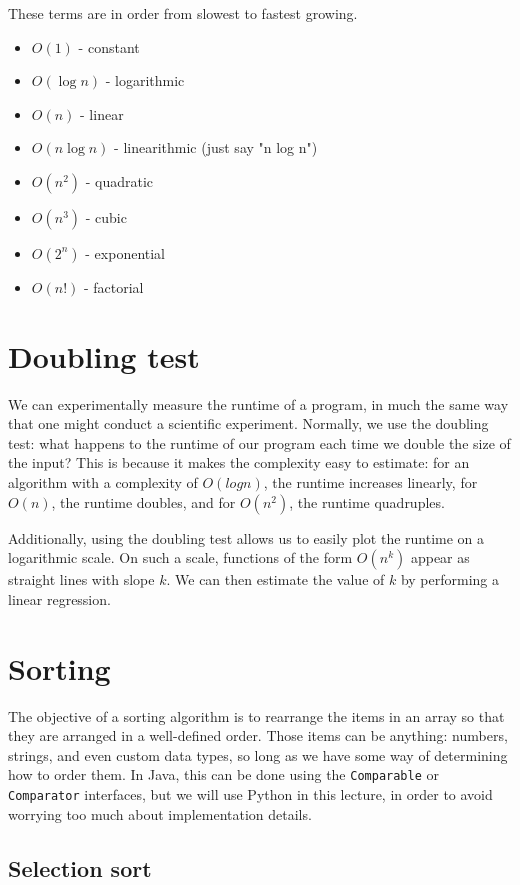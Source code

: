 \documentclass{article}
\begin{document}
These terms are in order from slowest to fastest growing.

\begin{itemize}
\item $O(1)$ - constant
\item $O(\log n)$ - logarithmic
\item $O(n)$ - linear
\item $O(n \log n)$ - linearithmic (just say "n log n")
\item $O(n^{2})$ - quadratic
\item $O(n^{3})$ - cubic
\item $O(2^{n})$ - exponential
\item $O(n!)$ - factorial
\end{itemize}

\section{Doubling test}

We can experimentally measure the runtime of a program, in much the same way that one might conduct a scientific experiment. Normally, we use the doubling test: what happens to the runtime of our program each time we double the size of the input? This is because it makes the complexity easy to estimate: for an algorithm with a complexity of $O(log n)$, the runtime increases linearly, for $O(n)$, the runtime doubles, and for $O(n^2)$, the runtime quadruples.

Additionally, using the doubling test allows us to easily plot the runtime on a logarithmic scale. On such a scale, functions of the form $O(n^k)$ appear as straight lines with slope $k$. We can then estimate the value of $k$ by performing a linear regression.

\section{Sorting}

The objective of a sorting algorithm is to rearrange the items in an array so that they are arranged in a well-defined order. Those items can be anything: numbers, strings, and even custom data types, so long as we have some way of determining how to order them. In Java, this can be done using the \texttt{Comparable} or \texttt{Comparator} interfaces, but we will use Python in this lecture, in order to avoid worrying too much about implementation details.


\subsection{Selection sort}
\end{document}
